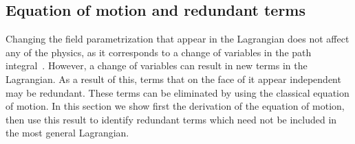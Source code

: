 \subsection{Equation of motion and redundant terms}

Changing the field parametrization that appear in the Lagrangian does not affect any of the physics, as it corresponds to a change of variables in the path integral~\cite{Scherer2002IntroductionTC,Chisholm:changeOfVar,Kamefuchi:changeOfVar}.
However, a change of variables can result in new terms in the Lagrangian.
As a result of this, terms that on the face of it appear independent may be redundant.
These terms can be eliminated by using the classical equation of motion.
In this section we show first the derivation of the equation of motion, then use this result to identify redundant terms which need not be included in the most general Lagrangian.

